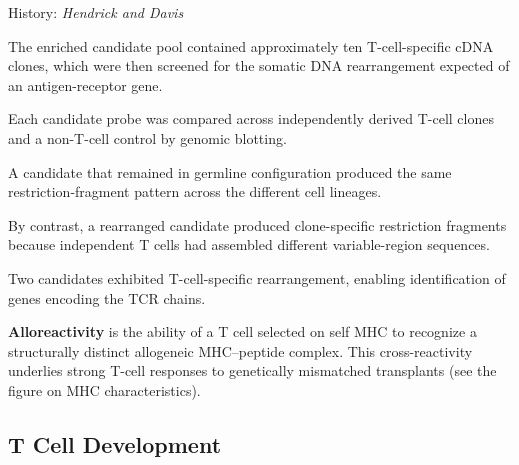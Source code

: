 \begin{core}{History: \textit{Hendrick and Davis}}
\begin{enumerate}[label=(\arabic*)]
            The enriched candidate pool contained approximately ten T-cell-specific cDNA clones, which were then screened for the somatic DNA rearrangement expected of an antigen-receptor gene.

            Each candidate probe was compared across independently derived T-cell clones and a non-T-cell control by genomic blotting.

            A candidate that remained in germline configuration produced the same restriction-fragment pattern across the different cell lineages.

            By contrast, a rearranged candidate produced clone-specific restriction fragments because independent T cells had assembled different variable-region sequences.

            Two candidates exhibited T-cell-specific rearrangement, enabling identification of genes encoding the TCR chains.

        \end{enumerate}

        \textbf{Alloreactivity} is the ability of a T cell selected on self MHC to recognize a structurally distinct allogeneic MHC--peptide complex. This cross-reactivity underlies strong T-cell responses to genetically mismatched transplants (see the figure on MHC characteristics).

      \end{core}

  \subsection{T Cell Development}

